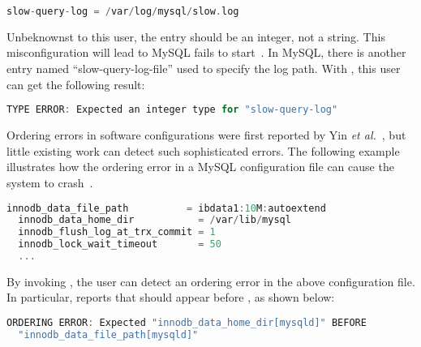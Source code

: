 \begin{lstlisting}[language=C, xleftmargin=.01\textwidth]
    slow-query-log = /var/log/mysql/slow.log
\end{lstlisting} 

Unbeknownst to this user, the entry  should be an 
integer, not a string. This misconfiguration will lead to 
MySQL fails to start~\cite{querylog}. In MySQL, there is another entry 
named ``slow-query-log-file'' used to specify the log path.
With \app, this user can get the following result:

\begin{lstlisting}[language=C, xleftmargin=.01\textwidth]
TYPE ERROR: Expected an integer type for "slow-query-log"
\end{lstlisting} 

Ordering errors in software configurations were first reported by 
Yin {\em et al.}~\cite{yin11anempirical}, but little existing work
can detect such sophisticated errors. The following example
illustrates how the ordering error in a MySQL configuration file
can cause the system to crash~\cite{innod-ordering}. 

\begin{lstlisting}[language=C, xleftmargin=.01\textwidth]
  innodb_data_file_path          = ibdata1:10M:autoextend
  innodb_data_home_dir           = /var/lib/mysql
  innodb_flush_log_at_trx_commit = 1
  innodb_lock_wait_timeout       = 50
  ... 
\end{lstlisting}

By invoking \app, the user can detect an ordering error in the
above configuration file.
In particular, \app reports that  
should appear before , as shown
below:
 
\begin{lstlisting}[language=C, xleftmargin=.01\textwidth]
ORDERING ERROR: Expected "innodb_data_home_dir[mysqld]" BEFORE
  "innodb_data_file_path[mysqld]" 
\end{lstlisting} 


